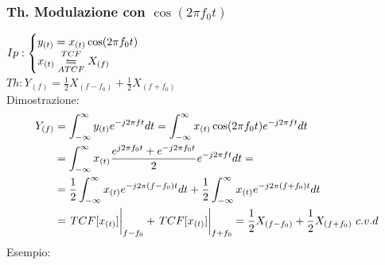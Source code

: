         \subsubsection{Th. Modulazione con $\cos(2\pi f_0t)$}\label{Modulazione con coseno}
            $Ip:\begin{cases}
                    y_{(t)}= x_{(t)}\cos(2\pi f_0t)\\        
                    x_{(t)}\overunderset{TCF}{ATCF}{\leftrightharpoons} X_{(f)}
                \end{cases}$\\
            $Th: Y_{(f)} = \frac{1}{2} X_{(f-f_0)} + \frac{1}{2} X_{(f+f_0)}$ \\
            Dimostrazione:
            \begin{align}
                Y_{(f)} & = \int_{-\infty}^{\infty} y_{(t)} e^{-j2\pi ft} dt = \int_{-\infty}^{\infty} x_{(t)}\cos(2\pi f_0t) e^{-j2\pi ft} dt \nonumber \\
                & =\int_{-\infty}^{\infty} x_{(t)} \frac{e^{j2\pi f_0t} + e^{-j2\pi f_0t}}{2} e^{-j2\pi ft} dt =  \nonumber \\
                & = \frac{1}{2} \int_{-\infty}^{\infty} x_{(t)} e^{-j2\pi (f-f_0)t} dt + \frac{1}{2} \int_{-\infty}^{\infty} x_{(t)} e^{-j2\pi (f+f_0)t} dt \nonumber \\
                & = \eval{TCF[x_{(t)}]}_{f-f_0} + \eval{TCF[x_{(t)}]}_{f+f_0} = \frac{1}{2} X_{(f-f_0)} + \frac{1}{2} X_{(f+f_0)}\ c.v.d \nonumber  
            \end{align}
            Esempio:\\
